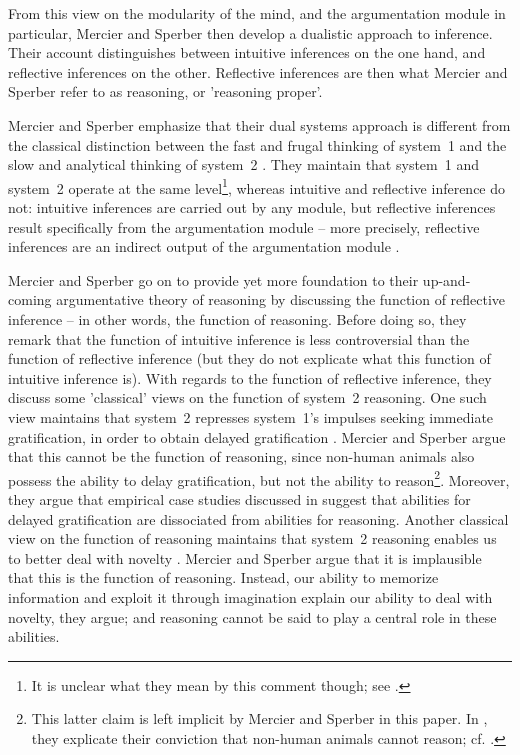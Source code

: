 From this view on the modularity of the mind, and the argumentation module in particular, Mercier and Sperber then develop a dualistic approach to inference.
Their account distinguishes between intuitive inferences on the one hand, and reflective inferences on the other. Reflective inferences are then what Mercier and Sperber refer to as reasoning, or 'reasoning proper'.

Mercier and Sperber emphasize that their dual systems approach is different from the classical distinction between the fast and frugal thinking of system~1 and the slow and analytical thinking of system~2 \citep[cf.][]{Kahneman11}. They maintain that system~1 and system~2 operate at the same level\footnote{It is unclear what they mean by this comment though; see \citet[p.~156]{MS09}.}, whereas intuitive and reflective inference do not: intuitive inferences are carried out by any module, but reflective inferences result specifically from the argumentation module -- more precisely, reflective inferences are an indirect output of the argumentation module \citep[p.~156]{MS09}.

Mercier and Sperber go on to provide yet more foundation to their up-and-coming argumentative theory of reasoning by discussing the function of reflective inference -- in other words, the function of reasoning.
Before doing so, they remark that the function of intuitive inference is less controversial than the function of reflective inference (but they do not explicate what this function of intuitive inference is).
With regards to the function of reflective inference, they discuss some 'classical' views on the function of system~2 reasoning.
One such view maintains that system~2 represses system~1's impulses seeking immediate gratification, in order to obtain delayed gratification \citep{Sloman96}. Mercier and Sperber argue that this cannot be the function of reasoning, since non-human animals also possess the ability to delay gratification, but not the ability to reason\footnote{This latter claim is left implicit by Mercier and Sperber in this paper. In \citet[p.~57]{MS11}, they explicate their conviction that non-human animals cannot reason; cf. \citet{Hume39}.}.
Moreover, they argue that empirical case studies discussed in \citet{Damasio94} suggest that abilities for delayed gratification are dissociated from abilities for reasoning.
Another classical view on the function of reasoning maintains that system~2 reasoning enables us to better deal with novelty \citep{EvansOver1996}.
Mercier and Sperber argue that it is implausible that this is the function of reasoning. Instead, our ability to memorize information and exploit it through imagination explain our ability to deal with novelty, they argue; and reasoning cannot be said to play a central role in these abilities.

